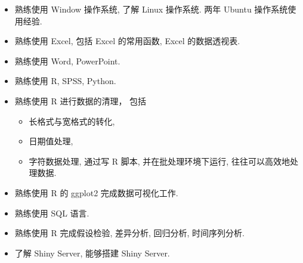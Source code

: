 \begin{itemize}
\item 熟练使用 Window 操作系统, 了解 Linux 操作系统. 两年 Ubuntu 操作系统使用经验.
\item 熟练使用 Excel, 包括 Excel 的常用函数, Excel 的数据透视表.
\item 熟练使用 Word, PowerPoint.
\item 熟练使用 R, SPSS, Python.
\item 熟练使用 R 进行数据的清理， 包括
\begin{itemize}
\item 长格式与宽格式的转化,
\item 日期值处理,
\item 字符数据处理,
通过写 R 脚本, 并在批处理环境下运行, 往往可以高效地处理数据.
\end{itemize}
\item 熟练使用 R 的 ggplot2 完成数据可视化工作.
\item 熟练使用 SQL 语言.
\item 熟练使用 R 完成假设检验, 差异分析, 回归分析, 时间序列分析.
\item 了解 Shiny Server, 能够搭建 Shiny Server.
\end{itemize}

